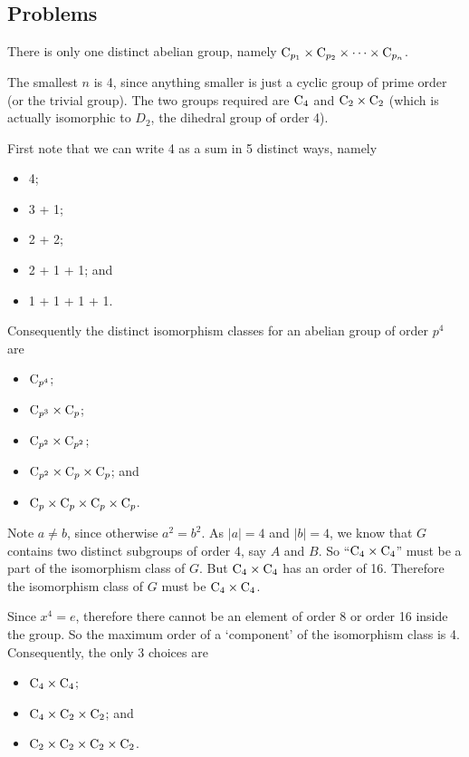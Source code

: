 \subsection*{Problems}
\begin{questions}
    \item There is only one distinct abelian group, namely $\mathrm{C}_{p_1}\times\mathrm{C}_{p_2}\times\cdots\times\mathrm{C}_{p_n}$.

    \item The smallest $n$ is 4, since anything smaller is just a cyclic group of prime order (or the trivial group). The two groups required are $\mathrm{C}_{4}$ and $\mathrm{C}_{2} \times \mathrm{C}_{2}$ (which is actually isomorphic to $D_2$, the dihedral group of order 4).

    \item First note that we can write 4 as a sum in 5 distinct ways, namely
    \begin{itemize}
        \item 4;
        \item 3 + 1;
        \item 2 + 2;
        \item 2 + 1 + 1; and
        \item 1 + 1 + 1 + 1.
    \end{itemize}
    Consequently the distinct isomorphism classes for an abelian group of order $p^4$ are
    \begin{itemize}
        \item $\mathrm{C}_{p^4}$;
        \item $\mathrm{C}_{p^3}\times\mathrm{C}_{p}$;
        \item $\mathrm{C}_{p^2}\times\mathrm{C}_{p^2}$;
        \item $\mathrm{C}_{p^2}\times\mathrm{C}_{p}\times\mathrm{C}_{p}$; and
        \item $\mathrm{C}_{p}\times\mathrm{C}_{p}\times\mathrm{C}_{p}\times\mathrm{C}_{p}$.
    \end{itemize}

    \item Note $a \neq b$, since otherwise $a^2 = b^2$. As $|a| = 4$ and $|b| = 4$, we know that $G$ contains two distinct subgroups of order 4, say $A$ and $B$. So ``$\mathrm{C}_{4} \times \mathrm{C}_{4}$'' must be a part of the isomorphism class of $G$. But $\mathrm{C}_{4} \times \mathrm{C}_{4}$ has an order of 16. Therefore the isomorphism class of $G$ must be $\mathrm{C}_{4} \times \mathrm{C}_{4}$.

    \item Since $x^4 = e$, therefore there cannot be an element of order 8 or order 16 inside the group. So the maximum order of a `component' of the isomorphism class is 4. Consequently, the only 3 choices are
    \begin{itemize}
        \item $\mathrm{C}_{4}\times\mathrm{C}_{4}$;
        \item $\mathrm{C}_{4}\times\mathrm{C}_{2}\times\mathrm{C}_{2}$; and
        \item $\mathrm{C}_{2}\times\mathrm{C}_{2}\times\mathrm{C}_{2}\times\mathrm{C}_{2}$.
    \end{itemize}
\end{questions}
